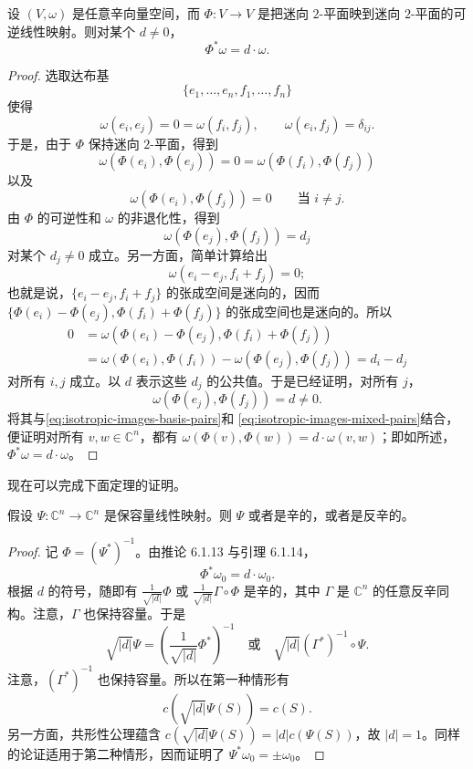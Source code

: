 \begin{lemma}\label{lem:isotropic-two-plane-conformal}
设 $(V,\omega)$ 是任意辛向量空间，而 $\Phi:V\to V$ 是把迷向
$2$-平面映到迷向 $2$-平面的可逆线性映射。则对某个 $d\ne0$，
\[
 \Phi^*\omega=d\cdot\omega.
\]
\end{lemma}

\begin{proof}
选取达布基
\[
 \{e_1,\ldots,e_n,f_1,\ldots,f_n\}
\]
使得
\[
 \omega(e_i,e_j)=0=\omega(f_i,f_j),
 \qquad \omega(e_i,f_j)=\delta_{ij}.
\]
于是，由于 $\Phi$ 保持迷向 $2$-平面，得到
\begin{equation}
 \omega(\Phi(e_i),\Phi(e_j))=0
 =\omega(\Phi(f_i),\Phi(f_j))
 \label{eq:isotropic-images-basis-pairs}
\end{equation}
以及
\begin{equation}
 \omega(\Phi(e_i),\Phi(f_j))=0
 \qquad\text{当 }i\ne j.
 \label{eq:isotropic-images-mixed-pairs}
\end{equation}
由 $\Phi$ 的可逆性和 $\omega$ 的非退化性，得到
\[
 \omega(\Phi(e_j),\Phi(f_j))=d_j
\]
对某个 $d_j\ne0$ 成立。另一方面，简单计算给出
\[
 \omega(e_i-e_j,f_i+f_j)=0;
\]
也就是说，$\{e_i-e_j,f_i+f_j\}$ 的张成空间是迷向的，因而
$\{\Phi(e_i)-\Phi(e_j),\Phi(f_i)+\Phi(f_j)\}$ 的张成空间也是迷向的。所以
\[
\begin{aligned}
 0&=\omega(\Phi(e_i)-\Phi(e_j),\Phi(f_i)+\Phi(f_j))\\
  &=\omega(\Phi(e_i),\Phi(f_i))
   -\omega(\Phi(e_j),\Phi(f_j))=d_i-d_j
\end{aligned}
\]
对所有 $i,j$ 成立。以 $d$ 表示这些 $d_j$ 的公共值。于是已经证明，对所有 $j$，
\[
 \omega(\Phi(e_j),\Phi(f_j))=d\ne0.
\]
将其与\eqref{eq:isotropic-images-basis-pairs}和
\eqref{eq:isotropic-images-mixed-pairs}结合，便证明对所有
$v,w\in\mathbb C^n$，都有
$\omega(\Phi(v),\Phi(w))=d\cdot\omega(v,w)$；即如所述，
$\Phi^*\omega=d\cdot\omega$。
\end{proof}

现在可以完成下面定理的证明。

\begin{theorem}\label{thm:linear-capacity-rigidity}
假设 $\Psi:\mathbb C^n\to\mathbb C^n$ 是保容量线性映射。则
$\Psi$ 或者是辛的，或者是反辛的。
\end{theorem}

\begin{proof}
记 $\Phi=(\Psi^*)^{-1}$。由推论 6.1.13 与引理 6.1.14，
\[
 \Phi^*\omega_0=d\cdot\omega_0.
\]
根据 $d$ 的符号，随即有
$\frac1{\sqrt{|d|}}\Phi$ 或
$\frac1{\sqrt{|d|}}\Gamma\circ\Phi$ 是辛的，其中 $\Gamma$ 是
$\mathbb C^n$ 的任意反辛同构。注意，$\Gamma$ 也保持容量。于是
\[
 \sqrt{|d|}\Psi
 =\left(\frac1{\sqrt{|d|}}\Phi^*\right)^{-1}
 \quad\text{或}\quad
 \sqrt{|d|}(\Gamma^*)^{-1}\circ\Psi.
\]
注意，$(\Gamma^*)^{-1}$ 也保持容量。所以在第一种情形有
\[
 c(\sqrt{|d|}\Psi(S))=c(S).
\]
另一方面，共形性公理蕴含
$c(\sqrt{|d|}\Psi(S))=|d|c(\Psi(S))$，故 $|d|=1$。同样的论证适用于第二种情形，因而证明了
$\Psi^*\omega_0=\pm\omega_0$。
\end{proof}

